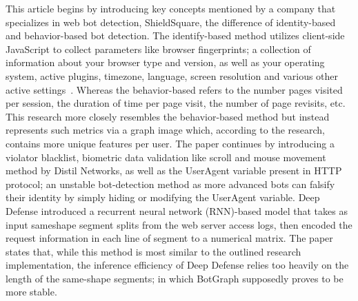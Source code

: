 This article begins by introducing key concepts mentioned by a company that specializes in web bot detection, ShieldSquare, the difference of identity-based and behavior-based bot detection.
The identify-based method utilizes client-side JavaScript to collect parameters like browser fingerprints; a collection of information about your browser type and version, as well as your operating system, active plugins, timezone, language, screen resolution and various other active settings~\cite{browser_fingerprinting}.
Whereas the behavior-based refers to the number pages visited per session, the duration of time per page visit, the number of page revisits, etc.
This research more closely resembles the behavior-based method but instead represents such metrics via a graph image which, according to the research, contains more unique features per user.
The paper continues by introducing a violator blacklist, biometric data validation like scroll and mouse movement method by Distil Networks, as well as the UserAgent variable present in HTTP protocol; an unstable bot-detection method as more advanced bots can falsify their identity by simply hiding or modifying the UserAgent variable.
Deep Defense introduced a recurrent neural network (RNN)-based model that takes as input sameshape segment splits from the web server access logs, then encoded the request information in each line of segment to a numerical matrix.
The paper states that, while this method is most similar to the outlined research implementation, the inference efficiency of Deep Defense relies too heavily on the length of the same-shape segments; in which BotGraph supposedly proves to be more stable.

